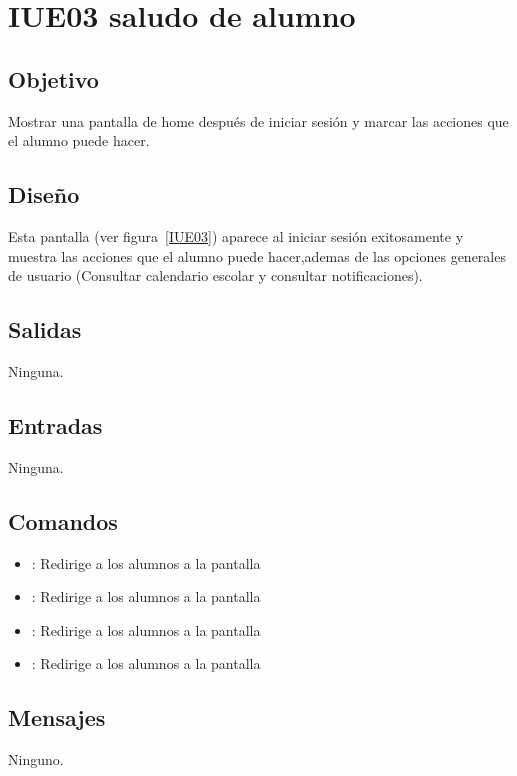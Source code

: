 \section{IUE03 saludo de alumno}

\subsection{Objetivo}
Mostrar una pantalla de home después de iniciar sesión y marcar las acciones que el alumno puede hacer.

\subsection{Diseño}
Esta pantalla  (ver figura~\ref{IUE03}) aparece al iniciar sesión exitosamente y muestra las acciones que el alumno puede hacer,ademas de las opciones generales de usuario (Consultar calendario escolar y consultar notificaciones). 


\subsection{Salidas}

Ninguna.

\subsection{Entradas}
Ninguna.

\subsection{Comandos}
\begin{itemize}
	\item {}: Redirige a los alumnos a la pantalla 
	\item {}: Redirige a los alumnos a la pantalla 
	\item {}: Redirige a los alumnos a la pantalla 
	\item {}: Redirige a los alumnos a la pantalla 
	
\end{itemize}

\subsection{Mensajes}

\begin{Citemize}
	\item Ninguno.
\end{Citemize}

